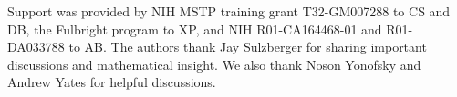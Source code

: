 Support was provided by NIH MSTP training grant T32-GM007288 to CS and DB, the Fulbright program to XP, and NIH R01-CA164468-01 and R01-DA033788 to AB. The authors thank Jay Sulzberger for sharing important discussions and mathematical insight. We also thank Noson Yonofsky and Andrew Yates for helpful discussions.
